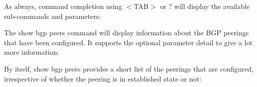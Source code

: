 \begin{description}
As always, command completion using $<$TAB$>$ or ? will display the
available sub-commands and parameters:

\vspace{0.1in}
\noindent{}

The {\stt show bgp peers} command will display information about the
BGP peerings that have been configured.  It supports the optional
parameter {\stt detail} to give a lot more information:

\vspace{0.1in}
\noindent{}

By itself, {\stt show bgp peers} provides a short list of the peerings
that are configured, irrespective of whether the peering is
in established state or not:


\end{description}
